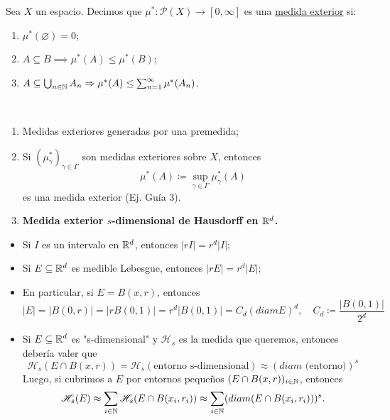 \begin{definition}
	Sea $X$ un espacio. Decimos que $\mu^{*} : \mathscr{P}(X)\to[0,\infty]$ es una \underline{medida exterior} si:
	\begin{enumerate}
		\item $\mu^{*}(\varnothing) = 0$;

		\item $A \subseteq B \implies \mu^{*}(A)\leq \mu^{*}(B)$;

		\item $A \subseteq \bigcup_{n\in\mathbb{N}} A_n \Rightarrow \mu^{*}(A) \leq \sum_{n=1}^{\infty} \mu^{*}(A_n)$.
	\end{enumerate}
\end{definition}

\begin{eg}~
	\begin{enumerate}
		\item Medidas exteriores generadas por una premedida;

		\item Si $(\mu_{\gamma}^{*})_{\gamma\in\Gamma}$ son medidas exteriores sobre $X$, entonces
		\[ \mu^{*}(A) \coloneq \sup_{\gamma\in\Gamma} \mu_{\gamma}^{*}(A) \]
		es una medida exterior (Ej. Guía 3).

		\item \textbf{Medida exterior $s$-dimensional de Hausdorff en $\mathbb{R}^d$.}
	\end{enumerate}
		\begin{itemize}
			\item Si $I$ es un intervalo en $\mathbb{R}^d$, entonces $|rI| = r^d|I|$;

			\item Si $E \subseteq \mathbb{R}^d$ es medible Lebesgue, entonces $|rE| = r^d|E|$;

			\item En particular, si $E = B(x,r)$, entonces
			\[ |E| = |B(0,r)| = |rB(0,1)| = r^d|B(0,1)| = C_d (diam E)^d,\quad C_d \coloneq \frac{|B(0,1)|}{2^d} \]

			\item Si $E \subseteq \mathbb{R}^d$ es "s-dimensional" y $\mathscr{H}_s$ es la medida que queremos, entonces debería valer que
			\[ \mathscr{H}_s(E\cap B(x,r)) = \mathscr{H}_s(\text{entorno s-dimensional}) \approx (diam \text{ (entorno)})^s \]
			Luego, si cubrimos a $E$ por entornos pequeños $(E \cap B(x,r))_{i\in\mathbb{N}}$, entonces
				\[ \mathscr{H}_s(E) \approx \sum_{i\in\mathbb{N}}\mathscr{H}_s (E \cap B(x_i,r_i)) \approx \sum_{i\in\mathbb{N}} (diam(E \cap B(x_i,r_i)))^s .\]
		\end{itemize}
\end{eg}
